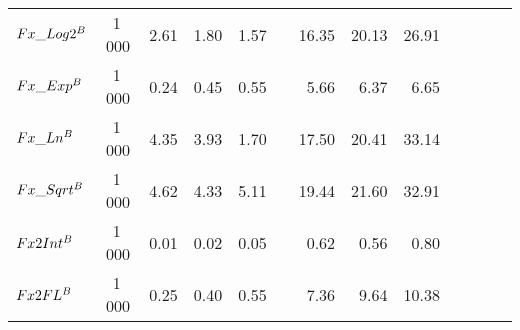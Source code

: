 \begin{table}
{\begin{tabular}{ l c c r r r r r r r r r r}
            $Fx\_Log2^{B}$                         & 1\,000  & 2.61                    & 1.80       & 1.57                    &  & 16.35       & 20.13       & 26.91       \\
            $Fx\_Exp^{B}$                          & 1\,000  & 0.24                    & 0.45       & 0.55                    &  & 5.66        & 6.37        & 6.65        \\
            $Fx\_Ln^{B}$                           & 1\,000  & 4.35                    & 3.93       & 1.70                    &  & 17.50       & 20.41       & 33.14       \\
            $Fx\_Sqrt^{B}$                         & 1\,000  & 4.62                    & 4.33       & 5.11                    &  & 19.44       & 21.60       & 32.91       \\
            $Fx2Int^{B}$                           & 1\,000  & 0.01                    & 0.02       & 0.05                    &  & 0.62        & 0.56        & 0.80        \\
            $Fx2FL^{B}$                            & 1\,000  & 0.25                    & 0.40       & 0.55                    &  & 7.36        & 9.64        & 10.38       \\
            \bottomrule
        \end{tabular}
    }
\end{table}
\FloatBarrier


